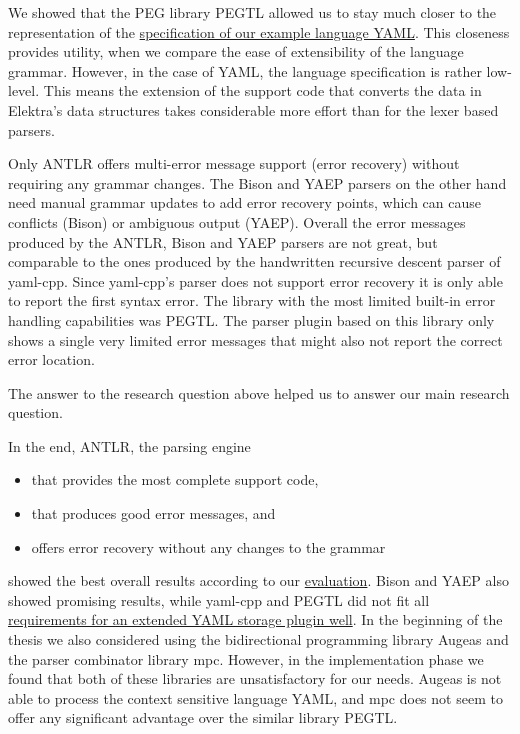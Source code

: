 \closeness*

We showed that the \gls{PEG} library \gls{PEGTL} allowed us to stay much closer to the representation of the \href{http://yaml.org/spec/1.2/spec.html}{specification of our example language YAML}. This closeness provides utility, when we compare the ease of extensibility of the language grammar. However, in the case of YAML, the language specification is rather low-level. This means the extension of the support code that converts the data in Elektra’s data structures takes considerable more effort than for the lexer based parsers.

\message*

Only ANTLR offers multi-error message support (error recovery) without requiring any grammar changes. The Bison and YAEP parsers on the other hand need manual grammar updates to add error recovery points, which can cause conflicts (Bison) or ambiguous output (\gls{YAEP}). Overall the error messages produced by the ANTLR, Bison and YAEP parsers are not great, but comparable to the ones produced by the handwritten recursive descent parser of yaml-cpp. Since yaml-cpp’s parser does not support error recovery it is only able to report the first syntax error. The library with the most limited built-in error handling capabilities was \gls{PEGTL}. The parser plugin based on this library only shows a single very limited error messages that might also not report the correct error location.

The answer to the research question above helped us to answer our main research question.

\main*

In the end, \gls{ANTLR}, the parsing engine

\begin{itemize}
  \item that provides the most complete support code,
  \item that produces good error messages, and
  \item offers error recovery without any changes to the grammar
\end{itemize}

showed the best overall results according to our \hyperref[sec:evaluation]{evaluation}. Bison and \gls{YAEP} also showed promising results, while yaml-cpp and PEGTL did not fit all \hyperref[sec:requirements_extended_yaml_plugin]{requirements for an extended YAML storage plugin well}. In the beginning of the thesis we also considered using the bidirectional programming library Augeas and the parser combinator library mpc. However, in the implementation phase we found that both of these libraries are unsatisfactory for our needs. Augeas is not able to process the context sensitive language YAML, and mpc does not seem to offer any significant advantage over the similar library \gls{PEGTL}.

